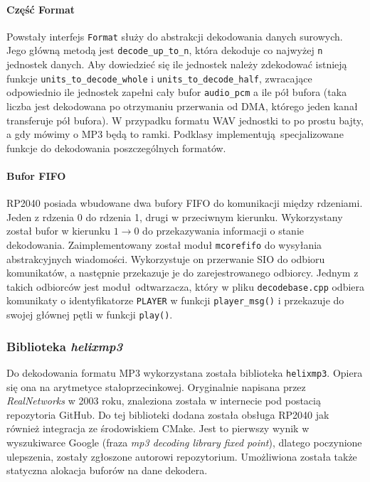 \documentclass[12pt]{report}
\begin{document}
			\paragraph{Część Format}
				Powstały interfejs \lstinline|Format| służy do abstrakcji dekodowania danych surowych. Jego główną metodą jest \lstinline|decode_up_to_n|, która dekoduje co najwyżej \lstinline|n| jednostek danych. Aby dowiedzieć się ile jednostek należy zdekodować istnieją funkcje \lstinline|units_to_decode_whole| i \lstinline|units_to_decode_half|, zwracające odpowiednio ile jednostek zapełni cały bufor \lstinline|audio_pcm| a ile pół bufora (taka liczba jest dekodowana po otrzymaniu przerwania od DMA, którego jeden kanał transferuje pół bufora). W przypadku formatu WAV jednostki to po prostu bajty, a gdy mówimy o MP3 będą to ramki. Podklasy implementują specjalizowane funkcje do dekodowania poszczególnych formatów.
			
			\paragraph{Bufor FIFO}
				RP2040 posiada wbudowane dwa bufory FIFO do komunikacji między rdzeniami. Jeden z rdzenia 0 do rdzenia 1, drugi w przeciwnym kierunku. Wykorzystany został bufor w kierunku $1 \rightarrow 0$ do przekazywania informacji o stanie dekodowania. Zaimplementowany został moduł \lstinline|mcorefifo| do wysyłania abstrakcyjnych wiadomości. Wykorzystuje on przerwanie SIO do odbioru komunikatów, a następnie przekazuje je do zarejestrowanego odbiorcy. Jednym z takich odbiorców jest moduł odtwarzacza, który w pliku \lstinline|decodebase.cpp| odbiera komunikaty o identyfikatorze \lstinline|PLAYER| w funkcji \lstinline|player_msg()| i przekazuje do swojej głównej pętli w funkcji \lstinline|play()|.
		
		\subsubsection{Biblioteka \textit{helixmp3}}
			Do dekodowania formatu MP3 wykorzystana została biblioteka \lstinline|helixmp3|. Opiera się ona na arytmetyce stałoprzecinkowej. Oryginalnie napisana przez \textit{RealNetworks}\textsuperscript{\cite{realnetworks}} w 2003 roku, znaleziona została w internecie pod postacią repozytoria GitHub\textsuperscript{\cite{helixmp3_repo}}. Do tej biblioteki dodana została obsługa RP2040 jak również integracja ze środowiskiem CMake. Jest to pierwszy wynik w wyszukiwarce Google (fraza \textit{mp3 decoding library fixed point}), dlatego poczynione ulepszenia, zostały zgłoszone autorowi repozytorium\textsuperscript{\cite{helixmp3_pr}}. Umożliwiona została także statyczna alokacja buforów na dane dekodera.
			
\end{document}
